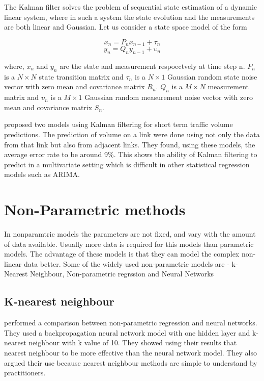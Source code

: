 The Kalman filter solves the problem of sequential state estimation of a dynamic linear system, where
in such a system the state evolution and the measurements are both linear and Gaussian. Let us consider
a state space model of the form

        \begin{equation} x_{n} = P_{n}x_{n-1} + \tau_{n} \end{equation}
        \begin{equation} y_{n} = Q_{n}y_{n-1} + \upsilon_{n} \end{equation}

where, $x_{n}$ and $y_{n}$ are the state and measurement respoectvely at time step n.
$P_{n}$ is a $N \times N$ state transition matrix and $\tau_{n}$ is a $N \times 1$ Gaussian
random state noise vector with zero mean and covariance matrix $R_{n}$. $Q_{n}$ is a $M \times N$
measurement matrix and $\upsilon_{n}$ is a $M \times 1$ Gaussian random measurement noise vector
with zero mean and covariance matrix $S_{n}$.


\citet{okutani1984dynamic} proposed two models using Kalman filtering for short term traffic volume
predictions. The prediction of volume on a link were done using not only the data from that link but
also from adjacent links. They found, using these models, the average error rate to be around 9\%.
This shows the ability of Kalman filtering to predict in a multivariate setting which is difficult in
other statistical regression models such as ARIMA. \citet{xie2007short} \citet{guo2010real}
\citet{guo2014adaptive}

\section{Non-Parametric methods}
In nonparamtric models the parameters are not fixed, and vary with the amount of data available.
Usually more data is required for this models than parametric models. The advantage of these models
is that they can model the complex non-linear data better. Some of the widely used non-parametric
models are - k-Nearest Neighbour, Non-parametric regrssion and Neural Networks

\subsection{K-nearest neighbour}
\citet{smith1994comparison} performed a comparison between non-parametric regression and neural
networks. They used a backpropagation neural network model with one hidden layer and k-nearest
neighbour with k value of 10. They showed using their results that nearest neighbour to be more
effective than the neural network model. They also argued their use because nearest neighbour methods
are simple to understand by practitioners.
\citet{lv2009real}

